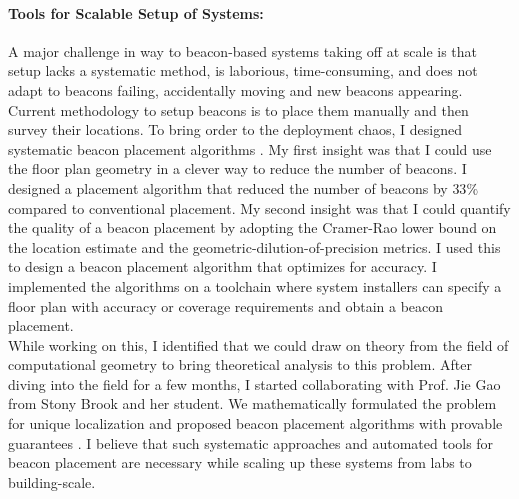 \documentclass[11pt]{article}
\begin{document}
\paragraph{Tools for Scalable Setup of Systems: }
A major challenge in way to beacon-based systems taking off at scale is that setup lacks a systematic method, is laborious, time-consuming, and does not adapt to beacons failing, accidentally moving and new beacons appearing. 
Current methodology to setup beacons is to place them manually and then survey their locations. 
To bring order to the deployment chaos, I designed systematic beacon placement algorithms \cite{rajagopal2016beacon}. %
My first insight was that I could use the floor plan geometry in a clever way to reduce the number of beacons. I designed a placement algorithm that reduced the number of beacons by $33\%$ compared to conventional placement. My second insight was that I could quantify the quality of a beacon placement by adopting the Cramer-Rao lower bound on the location estimate and the geometric-dilution-of-precision metrics. %
I used this to design a beacon placement algorithm that optimizes for accuracy. I implemented the algorithms on a toolchain where system installers can specify a floor plan with accuracy or coverage requirements and obtain a beacon placement. \\%

While working on this, I identified that we could draw on theory from the field of computational geometry to bring theoretical analysis to this problem. After diving into the field for a few months, I started collaborating with
Prof. Jie Gao from Stony Brook and her student. We mathematically
formulated the problem for unique localization and proposed beacon placement
algorithms with provable guarantees \cite{beaconplacementtheory}.  
I believe that such systematic approaches and automated tools for beacon
placement are necessary while scaling up these systems from labs to
building-scale.
\end{document}
